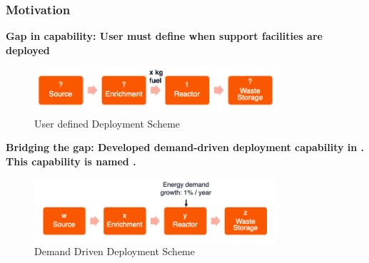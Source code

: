   \begin{frame}
    \frametitle{Motivation}

    \textbf{Gap in capability: User must define when support facilities are deployed}

    \begin{figure}[htbp!]
      \begin{center}
        \includegraphics[width=0.8\textwidth]{images/user-deploy}
      \end{center}
            \caption{User defined Deployment Scheme }
    \end{figure}

    \textbf{Bridging the gap: Developed demand-driven deployment capability in \Cyclus. This capability is named \deploy.}

    \begin{figure}[htbp!]
      \begin{center}
        \includegraphics[width=0.8\textwidth]{images/auto-deploy}
      \end{center}
            \caption{Demand Driven Deployment Scheme}
    \end{figure}

  \end{frame}
